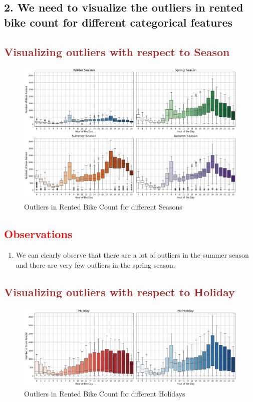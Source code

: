 \documentclass[12pt, letterpaper]{article}
\begin{document}
\newpage

\subsection*{2. We need to visualize the outliers in rented bike count for different categorical features}

\subsection*{\textcolor{brown}{Visualizing outliers with respect to Season}}
\begin{figure}[h]
  \centering
  \includegraphics[width=1\textwidth]{season2.png}
  \caption{Outliers in Rented Bike Count for different Seasons}
\end{figure}

\subsection*{\textcolor{red}{Observations}}
\begin{enumerate}
  \item We can clearly observe that there are a lot of outliers in the summer season and there are very few outliers in the spring season.
\end{enumerate}

\newpage

\subsection*{\textcolor{brown}{Visualizing outliers with respect to Holiday}}
\begin{figure}[h]
  \centering
  \includegraphics[width=1\textwidth]{holiday2.png}
  \caption{Outliers in Rented Bike Count for different Holidays}
\end{figure}
\end{document}

